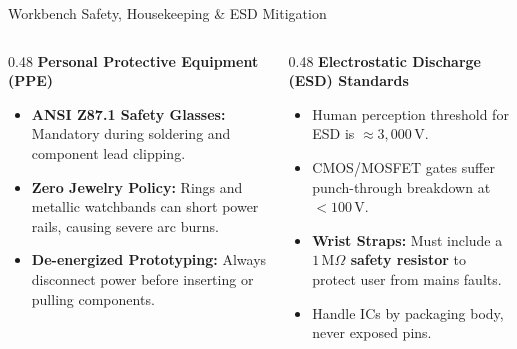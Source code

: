 \begin{frame}{Workbench Safety, Housekeeping \& ESD Mitigation}
    \begin{columns}[T]
        \begin{column}{0.48\textwidth}
            \textbf{Personal Protective Equipment (PPE)}
            \begin{itemize}
                \item \textbf{ANSI Z87.1 Safety Glasses:} Mandatory during soldering and component lead clipping.
                \item \textbf{Zero Jewelry Policy:} Rings and metallic watchbands can short power rails, causing severe arc burns.
                \item \textbf{De-energized Prototyping:} Always disconnect power before inserting or pulling components.
            \end{itemize}
        \end{column}
        \begin{column}{0.48\textwidth}
            \textbf{Electrostatic Discharge (ESD) Standards}
            \begin{itemize}
                \item Human perception threshold for ESD is $\approx 3{,}000\,\text{V}$.
                \item CMOS/MOSFET gates suffer punch-through breakdown at $<100\,\text{V}$.
                \item \textbf{Wrist Straps:} Must include a \textbf{$1\,\text{M}\Omega$ safety resistor} to protect user from mains faults.
                \item Handle ICs by packaging body, never exposed pins.
            \end{itemize}
        \end{column}
    \end{columns}
\end{frame}

